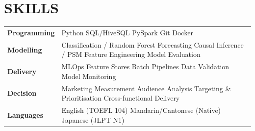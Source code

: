 \documentclass[a4paper,10pt]{article}
\begin{document}
\section{SKILLS}
\begin{tabular}{@{}p{2.5cm}p{14.5cm}@{}}
\textbf{Programming} & Python \textperiodcentered{} SQL/HiveSQL \textperiodcentered{} PySpark \textperiodcentered{} Git \textperiodcentered{} Docker \\[0.5pt]
\textbf{Modelling} & Classification / Random Forest \textperiodcentered{} Forecasting \textperiodcentered{} Causal Inference / PSM \textperiodcentered{} Feature Engineering \textperiodcentered{} Model Evaluation \\[0.5pt]
\textbf{Delivery} & MLOps \textperiodcentered{} Feature Stores \textperiodcentered{} Batch Pipelines \textperiodcentered{} Data Validation \textperiodcentered{} Model Monitoring \\[0.5pt]
\textbf{Decision} & Marketing Measurement \textperiodcentered{} Audience Analysis \textperiodcentered{} Targeting \& Prioritisation \textperiodcentered{} Cross-functional Delivery \\[0.5pt]
\textbf{Languages} & English (TOEFL 104) \textperiodcentered{} Mandarin/Cantonese (Native) \textperiodcentered{} Japanese (JLPT N1) \\
\end{tabular}
\end{document}
